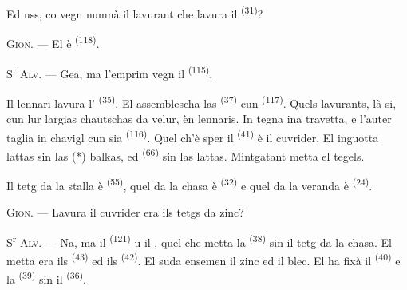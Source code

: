 Ed uss, co vegn numnà il lavurant che lavura il 
\textsuperscript{(31)}?

\textsc{Gion}. --- El è  \textsuperscript{(118)}.

\VUsaut{3.0mm}
\VUsaut{3.0mm}

S\textsuperscript{r} \textsc{Alv}. --- Gea, ma l'emprim vegn il 
\textsuperscript{(115)}.

Il lennari lavura l' \textsuperscript{(35)}. El assemblescha las
 \textsuperscript{(37)} cun  \textsuperscript{(117)}. Quels
lavurants, là si, cun lur largias chautschas da velur, èn lennaris. In tegna ina
travetta, e l'auter taglia in chavigl cun sia  \textsuperscript{(116)}.
Quel ch'è sper il  \textsuperscript{(41)} è il cuvrider. El inguotta
lattas sin las (*) balkas, ed  \textsuperscript{(66)} sin las lattas.
Mintgatant metta el tegels.


Il tetg da la stalla è  \textsuperscript{(55)}, quel da la
chasa è  \textsuperscript{(32)} e quel da la veranda è
 \textsuperscript{(24)}.

\textsc{Gion}. --- Lavura il cuvrider era ils tetgs da zinc?

S\textsuperscript{r} \textsc{Alv}. --- Na, ma il 
\textsuperscript{(121)} u il , quel che metta la
 \textsuperscript{(38)} sin il tetg da la chasa. El metta era
ils  \textsuperscript{(43)} ed ils 
\textsuperscript{(42)}. El suda ensemen il zinc ed il blec. El ha fixà il
 \textsuperscript{(40)} e la 
\textsuperscript{(39)} sin il  \textsuperscript{(36)}.

